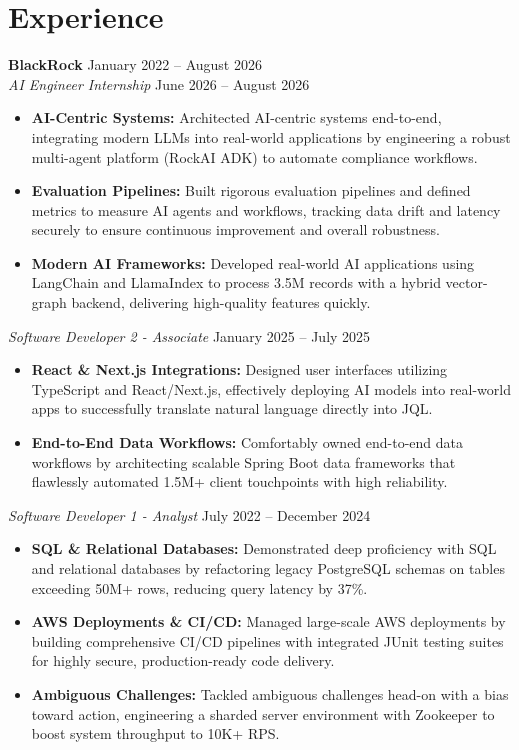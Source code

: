 \documentclass[11pt,a4paper]{article}
\begin{document}
\section{Experience}
\noindent
\textbf{BlackRock} \hfill January 2022 -- August 2026 \\
\textit{AI Engineer Internship} \hfill June 2026 -- August 2026
\begin{itemize}[leftmargin=*,noitemsep,topsep=0pt]
    \item \textbf{AI-Centric Systems:} Architected AI-centric systems end-to-end, integrating modern LLMs into real-world applications by engineering a robust multi-agent platform (RockAI ADK) to automate compliance workflows.
    \item \textbf{Evaluation Pipelines:} Built rigorous evaluation pipelines and defined metrics to measure AI agents and workflows, tracking data drift and latency securely to ensure continuous improvement and overall robustness.
    \item \textbf{Modern AI Frameworks:} Developed real-world AI applications using LangChain and LlamaIndex to process 3.5M records with a hybrid vector-graph backend, delivering high-quality features quickly.
\end{itemize}

\vspace{3pt}
\noindent
\textit{Software Developer 2 - Associate} \hfill January 2025 -- July 2025
\begin{itemize}[leftmargin=*,noitemsep,topsep=0pt]
    \item \textbf{React \& Next.js Integrations:} Designed user interfaces utilizing TypeScript and React/Next.js, effectively deploying AI models into real-world apps to successfully translate natural language directly into JQL.
    \item \textbf{End-to-End Data Workflows:} Comfortably owned end-to-end data workflows by architecting scalable Spring Boot data frameworks that flawlessly automated 1.5M+ client touchpoints with high reliability.
\end{itemize}

\vspace{3pt}
\noindent
\textit{Software Developer 1 - Analyst} \hfill July 2022 -- December 2024
\begin{itemize}[leftmargin=*,noitemsep,topsep=0pt]
    \item \textbf{SQL \& Relational Databases:} Demonstrated deep proficiency with SQL and relational databases by refactoring legacy PostgreSQL schemas on tables exceeding 50M+ rows, reducing query latency by 37\%.
    \item \textbf{AWS Deployments \& CI/CD:} Managed large-scale AWS deployments by building comprehensive CI/CD pipelines with integrated JUnit testing suites for highly secure, production-ready code delivery.
    \item \textbf{Ambiguous Challenges:} Tackled ambiguous challenges head-on with a bias toward action, engineering a sharded server environment with Zookeeper to boost system throughput to 10K+ RPS.
\end{itemize}
\end{document}
